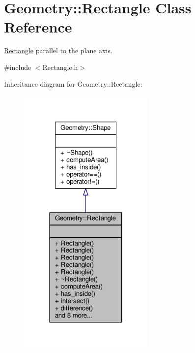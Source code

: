\hypertarget{classGeometry_1_1Rectangle}{}\section{Geometry\+:\+:Rectangle Class Reference}
\label{classGeometry_1_1Rectangle}


\hyperlink{classGeometry_1_1Rectangle}{Rectangle} parallel to the plane axis.  




{\ttfamily \#include $<$Rectangle.\+h$>$}



Inheritance diagram for Geometry\+:\+:Rectangle\+:\nopagebreak
\begin{figure}[H]
\begin{center}
\leavevmode
\includegraphics[width=190pt]{classGeometry_1_1Rectangle__inherit__graph}
\end{center}
\end{figure}


